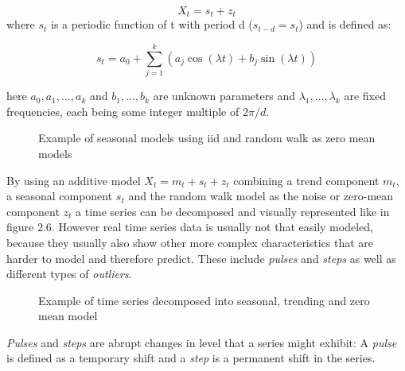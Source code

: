 \begin{equation}\label{eq:simple_seasonal_model}
X_t = s_t + z_t
\end{equation}
where \(s_t\) is a periodic function of t with period d (\(s_{t-d}= s_t\)) and is defined as: 


\begin{equation}\label{eq:harmonic_regression}
s_t = a_0 + \displaystyle\sum_{j=1}^{k} (a_j \cos(\lambda t) + b_j \sin(\lambda t ))
\end{equation}

here \(a_0, a_1, . . . , a_k\) and \(b_1, . . . , b_k\) are unknown parameters and \(\lambda_1, . . . , \lambda_k\) are fixed frequencies, each being some integer multiple of \(2\pi/d\).

\begin{figure}[ht]
	\centering
	\caption{Example of seasonal models using \acs{iid} and random walk as zero mean models}
\end{figure}

By using an additive model \(X_t= m_t + s_t + z_t\) combining a trend component \(m_t\), a seasonal component \(s_t\) and the random walk model as the noise or zero-mean component \(z_t\) a time series can be decomposed and visually represented like in figure 2.6. However real time series data is usually not that easily modeled, because they usually also show other more complex characteristics that are harder to model and therefore predict. These include \textit{pulses} and \textit{steps} as well as different types of \textit{outliers}.

\begin{figure}[ht]
	\centering
	\caption{Example of time series decomposed into seasonal, trending and zero mean model}
\end{figure}
\textit{Pulses} and \textit{steps} are abrupt changes in level that a series might exhibit:
A \textit{pulse} is defined as a temporary shift and a \textit{step} is a permanent shift in the series.

